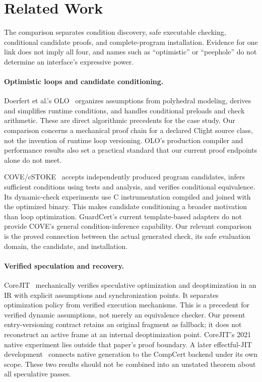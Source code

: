 \section{Related Work}
\label{sec:related}

The comparison separates condition discovery, safe executable checking,
conditional candidate proofs, and complete-program installation. Evidence for
one link does not imply all four, and names such as ``optimistic'' or ``peephole''
do not determine an interface's expressive power.

\paragraph{Optimistic loops and candidate conditioning.}
Doerfert et al.'s OLO~\cite{olo2017} organizes assumptions from polyhedral
modeling, derives and simplifies runtime conditions, and handles conditional
preloads and check arithmetic. These are direct algorithmic precedents for the
case study. Our comparison concerns a mechanical proof chain for a declared
Clight source class, not the invention of runtime loop versioning. OLO's
production compiler and performance results also set a practical standard that
our current proof endpoints alone do not meet.

COVE/cSTOKE~\cite{cove2015} accepts independently produced program candidates,
infers sufficient conditions using tests and analysis, and verifies conditional
equivalence. Its dynamic-check experiments use C instrumentation compiled and
joined with the optimized binary. This makes candidate conditioning a broader
motivation than loop optimization. GuardCert's current template-based adapters
do not provide COVE's general condition-inference capability. Our relevant
comparison is the proved connection between the actual generated check, its
safe evaluation domain, the candidate, and installation.

\paragraph{Verified speculation and recovery.}
CoreJIT~\cite{corejit2021} mechanically verifies speculative optimization and
deoptimization in an IR with explicit assumptions and synchronization points.
It separates optimization policy from verified execution mechanisms. This is a
precedent for verified dynamic assumptions, not merely an equivalence checker.
Our present entry-versioning contract retains an original fragment as fallback;
it does not reconstruct an active frame at an internal deoptimization point.
CoreJIT's 2021 native experiment lies outside that paper's proof boundary.
A later effectful-JIT development~\cite{fmjit2023} connects native generation to
the CompCert backend under its own scope. These two results should not be
combined into an unstated theorem about all speculative passes.

